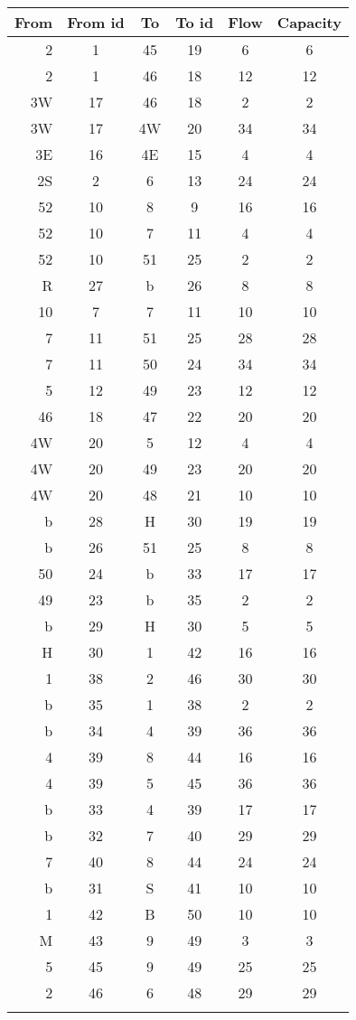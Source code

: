 \documentclass{tufte-handout}
\begin{document}
  \begin{tabular}{rccccc}\toprule
From&From id&To&To id&Flow&Capacity   \\\midrule
2   &1      &45&19   &6   &6          \\
2   &1      &46&18   &12  &12         \\
3W  &17     &46&18   &2   &2          \\
3W  &17     &4W&20   &34  &34         \\
3E  &16     &4E&15   &4   &4          \\
2S  &2      &6 &13   &24  &24         \\
52  &10     &8 &9    &16  &16         \\
52  &10     &7 &11   &4   &4          \\
52  &10     &51&25   &2   &2          \\
R   &27     &b &26   &8   &8          \\
10  &7      &7 &11   &10  &10         \\
7   &11     &51&25   &28  &28         \\
7   &11     &50&24   &34  &34         \\
5   &12     &49&23   &12  &12         \\
46  &18     &47&22   &20  &20         \\
4W  &20     &5 &12   &4   &4          \\
4W  &20     &49&23   &20  &20         \\
4W  &20     &48&21   &10  &10         \\
b   &28     &H &30   &19  &19         \\
b   &26     &51&25   &8   &8          \\
50  &24     &b &33   &17  &17         \\
49  &23     &b &35   &2   &2          \\
b   &29     &H &30   &5   &5          \\
H   &30     &1 &42   &16  &16         \\
1   &38     &2 &46   &30  &30         \\
b   &35     &1 &38   &2   &2          \\
b   &34     &4 &39   &36  &36         \\
4   &39     &8 &44   &16  &16         \\
4   &39     &5 &45   &36  &36         \\
b   &33     &4 &39   &17  &17         \\
b   &32     &7 &40   &29  &29         \\
7   &40     &8 &44   &24  &24         \\
b   &31     &S &41   &10  &10         \\
1   &42     &B &50   &10  &10         \\
M   &43     &9 &49   &3   &3          \\
5   &45     &9 &49   &25  &25         \\
2   &46     &6 &48   &29  &29         \\
 \\\bottomrule
  \end{tabular}
\bigskip
\end{document}
